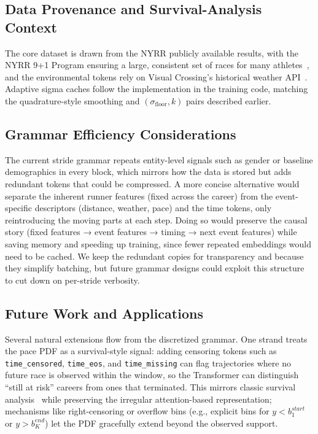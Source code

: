 \documentclass{article}
\begin{document}
\subsection{Data Provenance and Survival-Analysis Context}
The core dataset is drawn from the NYRR publicly available results, with the NYRR 9+1 Program ensuring a large, consistent set of races for many athletes~\cite{nyrr2024}, and the environmental tokens rely on Visual Crossing’s historical weather API~\cite{visualcrossing2024}.  Adaptive sigma caches follow the implementation in the training code, matching the quadrature-style smoothing and \((\sigma_{\text{floor}}, k)\) pairs described earlier.

\subsection{Grammar Efficiency Considerations}
The current stride grammar repeats entity-level signals such as gender or baseline demographics in every block, which mirrors how the data is stored but adds redundant tokens that could be compressed. A more concise alternative would separate the inherent runner features (fixed across the career) from the event-specific descriptors (distance, weather, pace) and the time tokens, only reintroducing the moving parts at each step. Doing so would preserve the causal story (fixed features → event features → timing → next event features) while saving memory and speeding up training, since fewer repeated embeddings would need to be cached. We keep the redundant copies for transparency and because they simplify batching, but future grammar designs could exploit this structure to cut down on per-stride verbosity.

\subsection{Future Work and Applications}
Several natural extensions flow from the discretized grammar. One strand treats the pace PDF as a survival-style signal: adding censoring tokens such as \texttt{time\_censored}, \texttt{time\_eos}, and \texttt{time\_missing} can flag trajectories where no future race is observed within the window, so the Transformer can distinguish “still at risk” careers from ones that terminated. This mirrors classic survival analysis~\cite{cox1972regression,katzman2018deepsurv,lee2018deephit} while preserving the irregular attention-based representation; mechanisms like right-censoring or overflow bins (e.g., explicit bins for \(y < b_1^{start}\) or \(y > b_K^{end}\)) let the PDF gracefully extend beyond the observed support.
\end{document}

